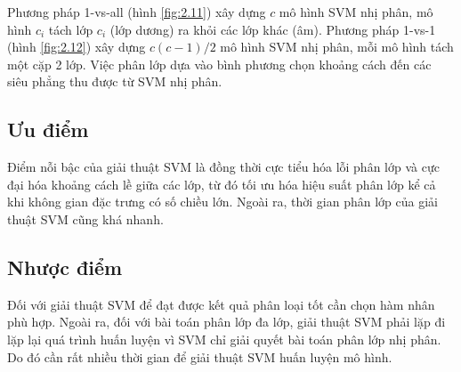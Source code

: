 Phương pháp 1-vs-all (hình \ref{fig:2.11}) xây dựng $c$ mô hình SVM nhị phân, mô hình $c_i$ tách lớp $c_i$ (lớp dương) ra khỏi các lớp khác (âm). Phương pháp 1-vs-1 (hình \ref{fig:2.12}) xây dựng $c(c-1)/2$ mô hình SVM nhị phân, mỗi mô hình tách một cặp 2 lớp. Việc phân lớp dựa vào bình phương chọn khoảng cách đến các siêu phẳng thu được từ SVM nhị phân.


\subsection{Ưu điểm}
Điểm nỗi bậc của giải thuật SVM là đồng thời cực tiểu hóa lỗi phân lớp và cực đại hóa khoảng cách lề giữa các lớp, từ đó tối ưu hóa hiệu suất phân lớp kể cả khi không gian đặc trưng có số chiều lớn. Ngoài ra, thời gian phân lớp của giải thuật SVM cũng khá nhanh.

\subsection{Nhược điểm}
Đối với giải thuật SVM để đạt được kết quả phân loại tốt cần chọn hàm nhân phù hợp. Ngoài ra, đối với bài toán phân lớp đa lớp, giải thuật SVM phải lặp đi lặp lại quá trình huấn luyện vì SVM chỉ giải quyết bài toán phân lớp nhị phân. Do đó cần rất nhiều thời gian để giải thuật SVM huấn luyện mô hình.











